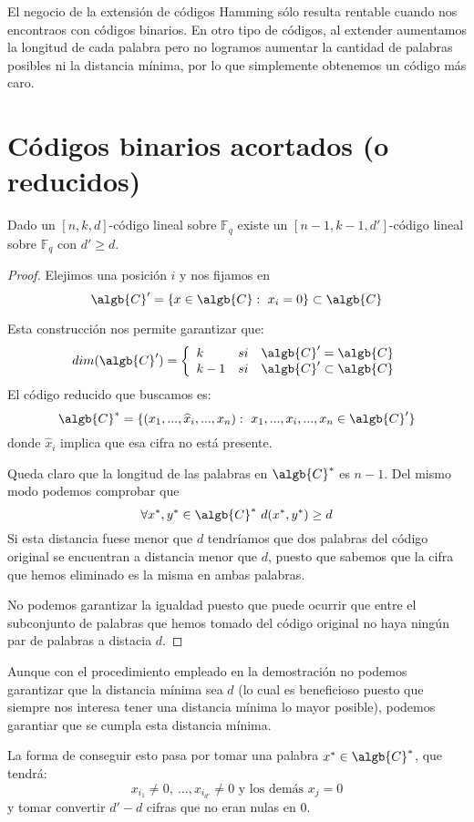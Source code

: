 El negocio de la extensión de códigos Hamming sólo resulta rentable cuando nos encontraos con códigos binarios. En otro tipo de códigos, al extender aumentamos la longitud de cada palabra pero no logramos aumentar la cantidad de palabras posibles ni la distancia mínima, por lo que simplemente obtenemos un código más caro.

\section{Códigos binarios acortados (o reducidos)}
\begin{prop}
Dado un $[n,k,d]$-código lineal sobre $\mathbb{F}_q$ existe un $[n-1,k-1,d']$-código lineal sobre $\mathbb{F}_q$ con $d' \geq d$.
\end{prop}
\begin{proof}
Elejimos una posición $i$ y nos fijamos en
\[\algb{C}'=\{x \in \algb{C} : \ x_i=0\}\subset \algb{C}\]

Esta construcción nos permite garantizar que:
\[dim(\algb{C}') = \left\{ \begin{array}{lll} k & si & \algb{C}'=\algb{C} \\
k-1 & si & \algb{C}' \subset \algb{C}\end{array}\right.\]
El código reducido que buscamos es:
\[\algb{C}^*=\{(x_1,...,\widehat{x}_i,...,x_n): \ x_1,...,x_i,...,x_n \in \algb{C}'\}\]
donde $\widehat{x}_i$ implica que esa cifra no está presente.

Queda claro que la longitud de las palabras en $\algb{C}^*$ es $n-1$. Del mismo modo podemos comprobar que
\[\forall x^*,y^* \in \algb{C}^* \ d(x^*,y^*)\geq d\]
Si esta distancia fuese menor que $d$ tendríamos que dos palabras del código original se encuentran a distancia menor que $d$, puesto que sabemos que la cifra que hemos eliminado es la misma en ambas palabras.

No podemos garantizar la igualdad puesto que puede ocurrir que entre el subconjunto de palabras que hemos tomado del código original no haya ningún par de palabras a distacia $d$.
\end{proof}

Aunque con el procedimiento empleado en la demostración no podemos garantizar que la distancia mínima sea $d$ (lo cual es beneficioso puesto que siempre nos interesa tener una distancia mínima lo mayor posible), podemos garantiar que se cumpla esta distancia mínima.

La forma de conseguir esto pasa por tomar una palabra $x^*\in \algb{C}^*$, que tendrá:
\[x_{i_1}\neq 0, \ ..., x_{i_{d'}}\neq 0 \text{ y los demás } x_j=0\]
y tomar convertir $d'-d$ cifras que no eran nulas en 0.


